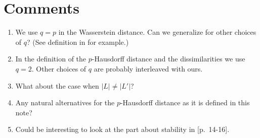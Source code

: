 	\section{Comments}
	\begin{enumerate}
		\item We use $q=p$ in the Wasserstein distance. Can we generalize for other choices of $q$? (See definition in \autocite{skraba2022wasserstein} for example.)
		\item In the definition of the $p$-Hausdorff distance and the dissimilarities we use $q=2$. Other choices of $q$ are probably interleaved with ours.
		\item What about the case when $|L|\neq|L'|$?
		\item Any natural alternatives for the $p$-Hausdorff distance as it is defined in this note?
		\item Could be interesting to look at the part about stability in \autocite{Brun_2019}[p.~14-16].
	\end{enumerate}

	\printbibliography

